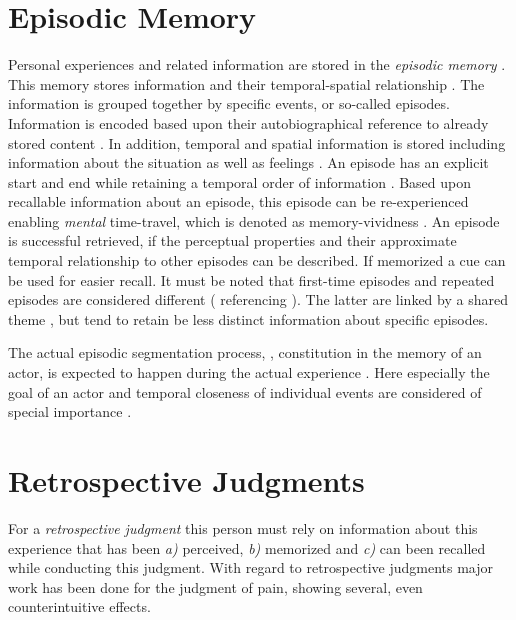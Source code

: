 \section{Episodic Memory}
Personal experiences and related information are stored in the \emph{episodic memory} \citep{tulving_episodic_1972}.
This memory stores information and their temporal-spatial relationship \citep[][p. 385]{tulving_episodic_1972}.
The information is grouped together by specific events, or so-called episodes.
Information is encoded based upon their autobiographical reference to already stored content \citep[][p. 385f.]{tulving_episodic_1972}.
In addition, temporal and spatial information is stored including information about the situation as well as feelings \citep[][p. 385f.]{tulving_episodic_1972}.
An episode has an explicit start and end while retaining a temporal order of information \citep[][p. 262]{conway_construction_2000}.
Based upon recallable information about an episode, this episode can be re-experienced enabling \emph{mental} time-travel, which is denoted as memory-vividness \citep{conway_construction_2000}.
An episode is successful retrieved, if the perceptual properties and their approximate temporal relationship to other episodes can be described.
If memorized a cue can be used for easier recall.
It must be noted that first-time episodes and repeated episodes are considered different (\citet{conway_construction_2000} referencing \citet{barsalou_construction_1988}).
The latter are linked by a shared theme \citep{robinson_first_1992}, but tend to retain be less distinct information about specific episodes.

The actual episodic segmentation process, \ie, constitution in the memory of an actor, is expected to happen during the actual experience \citep{ezzyat_what_2011, kurby_segmentation_2008}.
Here especially the goal of an actor and temporal closeness of individual events are considered of special importance \cite{black_episodes_1979}.

\section{Retrospective Judgments}
For a \emph{retrospective judgment} this person must rely on information about this experience that has been \emph{a)} perceived, \emph{b)} memorized and \emph{c)} can been recalled while conducting this judgment.
With regard to retrospective judgments major work has been done for the judgment of pain, showing several, even counterintuitive effects.

